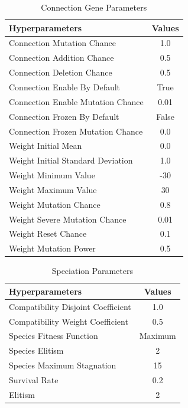 \documentclass[letterpaper, 12pt]{article}
\begin{document}
\begin{table}[H]
\centering
\caption{Connection Gene Parameters}
\begin{NiceTabular}{X|c}
\toprule
\textbf{Hyperparameters} & \textbf{Values} \\
\midrule
Connection Mutation Chance & 1.0 \\
Connection Addition Chance & 0.5 \\
Connection Deletion Chance & 0.5 \\
Connection Enable By Default & True \\
Connection Enable Mutation Chance & 0.01 \\
Connection Frozen By Default & False \\
Connection Frozen Mutation Chance & 0.0 \\

Weight Initial Mean & 0.0 \\
Weight Initial Standard Deviation & 1.0 \\
Weight Minimum Value & -30 \\
Weight Maximum Value & 30 \\
Weight Mutation Chance & 0.8 \\
Weight Severe Mutation Chance & 0.01 \\
Weight Reset Chance & 0.1 \\
Weight Mutation Power & 0.5 \\
\bottomrule
\end{NiceTabular}
\end{table}

\begin{table}[H]
\centering
\caption{Speciation Parameters}
\begin{NiceTabular}{X|c}
\toprule
\textbf{Hyperparameters} & \textbf{Values} \\
\midrule
Compatibility Disjoint Coefficient & 1.0 \\
Compatibility Weight Coefficient & 0.5 \\
Species Fitness Function & Maximum \\
Species Elitism & 2 \\
Species Maximum Stagnation & 15 \\
Survival Rate & 0.2 \\
Elitism & 2 \\
\bottomrule
\end{NiceTabular}
\end{table}
\end{document}
